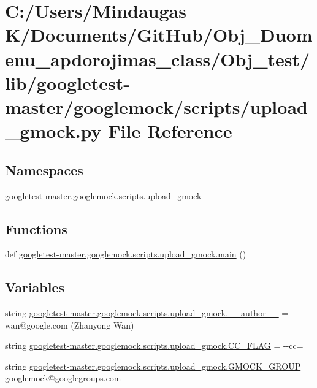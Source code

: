 \hypertarget{_obj__test_2lib_2googletest-master_2googlemock_2scripts_2upload__gmock_8py}{}\section{C\+:/\+Users/\+Mindaugas K/\+Documents/\+Git\+Hub/\+Obj\+\_\+\+Duomenu\+\_\+apdorojimas\+\_\+class/\+Obj\+\_\+test/lib/googletest-\/master/googlemock/scripts/upload\+\_\+gmock.py File Reference}
\label{_obj__test_2lib_2googletest-master_2googlemock_2scripts_2upload__gmock_8py}
\subsection*{Namespaces}
\begin{DoxyCompactItemize}
\item 
 \mbox{\hyperlink{namespacegoogletest-master_1_1googlemock_1_1scripts_1_1upload__gmock}{googletest-\/master.\+googlemock.\+scripts.\+upload\+\_\+gmock}}
\end{DoxyCompactItemize}
\subsection*{Functions}
\begin{DoxyCompactItemize}
\item 
def \mbox{\hyperlink{namespacegoogletest-master_1_1googlemock_1_1scripts_1_1upload__gmock_a3c40901192a7df065a98ddbdbc25155a}{googletest-\/master.\+googlemock.\+scripts.\+upload\+\_\+gmock.\+main}} ()
\end{DoxyCompactItemize}
\subsection*{Variables}
\begin{DoxyCompactItemize}
\item 
string \mbox{\hyperlink{namespacegoogletest-master_1_1googlemock_1_1scripts_1_1upload__gmock_a2e3ad151696c95117da3b37c5c1b2289}{googletest-\/master.\+googlemock.\+scripts.\+upload\+\_\+gmock.\+\_\+\+\_\+author\+\_\+\+\_\+}} = \textquotesingle{}wan@google.\+com (Zhanyong Wan)\textquotesingle{}
\item 
string \mbox{\hyperlink{namespacegoogletest-master_1_1googlemock_1_1scripts_1_1upload__gmock_ac7626eddec398f84234dc6d992285a72}{googletest-\/master.\+googlemock.\+scripts.\+upload\+\_\+gmock.\+C\+C\+\_\+\+F\+L\+AG}} = \textquotesingle{}-\/-\/cc=\textquotesingle{}
\item 
string \mbox{\hyperlink{namespacegoogletest-master_1_1googlemock_1_1scripts_1_1upload__gmock_ac16ff3118c2930a0f956c29dc0751e7d}{googletest-\/master.\+googlemock.\+scripts.\+upload\+\_\+gmock.\+G\+M\+O\+C\+K\+\_\+\+G\+R\+O\+UP}} = \textquotesingle{}googlemock@googlegroups.\+com\textquotesingle{}
\end{DoxyCompactItemize}
